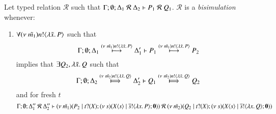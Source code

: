 \begin{definition}[Bisimulation]\label{d:bisim}\rm
	Let typed relation $\mathcal{R}$ such that $\Gamma; \emptyset; \Delta_1\ \mathcal{R}\ \Delta_2 \proves P_1\ \mathcal{R}\ Q_1$.
	$\mathcal{R}$ is a {\em bisimulation} whenever:
	\begin{enumerate}
		\item	$\forall \news{\tilde{m_1}} \bactout{n}{\abs{\tilde{x}}{P}}$ such that
			\[
				\horel{\Gamma}{\Delta_1}{P_1}{\hby{\news{\tilde{m_1}} \bactout{n}{\abs{\tilde{x}}{P}}}}{\Delta_1'}{P_2}
			\]
			implies that $\exists Q_2, \abs{\tilde{x}}{Q}$ such that
			\[
				\horel{\Gamma}{\Delta_2}{Q_1}{\Hby{\news{\tilde{m_2}} \bactout{n}{\abs{\tilde{x}}{Q}}}}{\Delta_2'}{Q_2}
			\]
			and for fresh $t$
			\[
				\horel{\Gamma}{\Delta_1''}{\newsp{\tilde{m_1}}{P_2 \Par \hotrigger{t}{\abs{x}{P}}}}{\ \mathcal{R}\ }{\Delta_2''}{\newsp{\tilde{m_2}}{Q_2 \Par \hotrigger{t}{\abs{x}{Q}}}}
			\]


\end{enumerate}
\end{definition}
